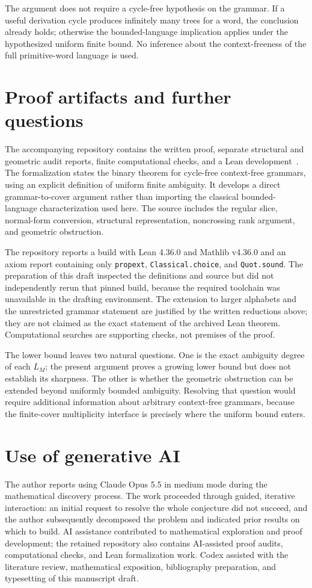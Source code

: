 \documentclass[a4paper,USenglish,cleveref,autoref]{lipics-v2021}
\begin{document}
The argument does not require a cycle-free hypothesis on the grammar.
If a useful derivation cycle produces infinitely many trees for a word, the conclusion already holds; otherwise the bounded-language implication applies under the hypothesized uniform finite bound.
No inference about the context-freeness of the full primitive-word language is used.

\section{Proof artifacts and further questions}
The accompanying repository contains the written proof, separate structural and geometric audit reports, finite computational checks, and a Lean development~\cite{Artifact}.
The formalization states the binary theorem for cycle-free context-free grammars, using an explicit definition of uniform finite ambiguity.
It develops a direct grammar-to-cover argument rather than importing the classical bounded-language characterization used here.
The source includes the regular slice, normal-form conversion, structural representation, noncrossing rank argument, and geometric obstruction.

The repository reports a build with Lean 4.36.0 and Mathlib v4.36.0 and an axiom report containing only \texttt{propext}, \texttt{Classical.choice}, and \texttt{Quot.sound}.
The preparation of this draft inspected the definitions and source but did not independently rerun that pinned build, because the required toolchain was unavailable in the drafting environment.
The extension to larger alphabets and the unrestricted grammar statement are justified by the written reductions above; they are not claimed as the exact statement of the archived Lean theorem.
Computational searches are supporting checks, not premises of the proof.

The lower bound leaves two natural questions.
One is the exact ambiguity degree of each $L_M$; the present argument proves a growing lower bound but does not establish its sharpness.
The other is whether the geometric obstruction can be extended beyond uniformly bounded ambiguity.
Resolving that question would require additional information about arbitrary context-free grammars, because the finite-cover multiplicity interface is precisely where the uniform bound enters.

\section*{Use of generative AI}
The author reports using Claude Opus 5.5 in medium mode during the mathematical discovery process.
The work proceeded through guided, iterative interaction: an initial request to resolve the whole conjecture did not succeed, and the author subsequently decomposed the problem and indicated prior results on which to build.
AI assistance contributed to mathematical exploration and proof development; the retained repository also contains AI-assisted proof audits, computational checks, and Lean formalization work.
Codex assisted with the literature review, mathematical exposition, bibliography preparation, and typesetting of this manuscript draft.
\end{document}
